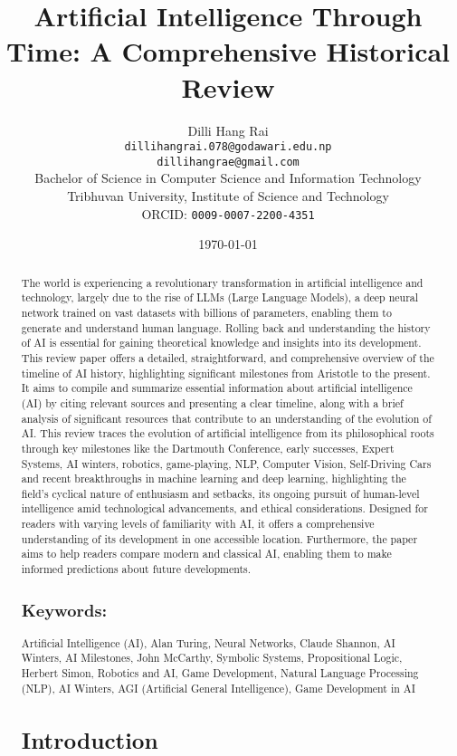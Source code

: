 \documentclass[12pt]{article}
\title{Artificial Intelligence Through Time: A 
Comprehensive Historical Review}
\author{
    Dilli Hang Rai \\
    \texttt{dillihangrai.078@godawari.edu.np} \\
    \texttt{dillihangrae@gmail.com} \\
    Bachelor of Science in Computer Science and Information Technology \\
    Tribhuvan University, Institute of Science and Technology \\
    ORCID: \texttt{0009-0007-2200-4351}
}
\date{\today}
\begin{document}
\maketitle

\begin{abstract}
{

The world is experiencing a revolutionary transformation in artificial intelligence and technology, largely due to the rise of LLMs (Large Language Models), a deep neural network trained on vast datasets with billions of parameters, enabling them to generate and understand human language. Rolling back and understanding the history of AI is essential for gaining theoretical knowledge and insights into its development. This review paper offers a detailed, straightforward, and comprehensive overview of the timeline of AI history, highlighting significant milestones from Aristotle to the present. It aims to compile and summarize essential information about artificial intelligence (AI) by citing relevant sources and presenting a clear timeline, along with a brief analysis of significant resources that contribute to an understanding of the evolution of AI.
This review traces the evolution of artificial intelligence from its philosophical roots through key milestones like the Dartmouth Conference, early successes, Expert Systems, AI winters, robotics, game-playing, NLP, Computer Vision, Self-Driving Cars and recent breakthroughs in machine learning and deep learning, highlighting the field's cyclical nature of enthusiasm and setbacks, its ongoing pursuit of human-level intelligence amid technological advancements, and ethical considerations. Designed for readers with varying levels of familiarity with AI, it offers a comprehensive understanding of its development in one accessible location. Furthermore, the paper aims to help readers compare modern and classical AI, enabling them to make informed predictions about future developments.


}
\subsection*{Keywords:} Artificial Intelligence (AI),
Alan Turing,
Neural Networks,
Claude Shannon,
AI Winters,
AI Milestones,
John McCarthy,
Symbolic Systems,
Propositional Logic,
Herbert Simon,
Robotics and AI,
Game Development,
Natural Language Processing (NLP),
AI Winters,
AGI (Artificial General Intelligence),
Game Development in AI

\section{Introduction}


\end{abstract}
\end{document}
